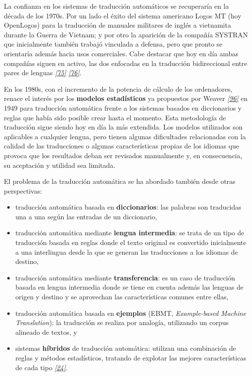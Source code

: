 \documentclass[a4paper,12pt,spanish]{book}
\begin{document}
La confianza en los sistemas de traducción automáticos se recuperaría en la década de
los 1970s. Por un lado el éxito del sistema americano Logos MT (hoy OpenLogos) para
la traducción de manuales militares de inglés a vietnamita durante la Guerra de
Vietnam; y por otro la aparición de la compañía SYSTRAN que inicialmente también
trabajó vinculada a defensa, pero que pronto se orientaría además hacia usos comerciales.
Cabe destacar que hoy en día ambas compañías siguen en activo, las dos enfocadas en la
traducción bidireccional entre pares de lenguas \label{0.intro:id19}{\hyperref[zreferences:scott2009]{\emph{{[}75{]}}}} \label{0.intro:id20}{\hyperref[zreferences:senellart2001]{\emph{{[}76{]}}}}.

En los 1980s, con el incremento de la potencia de cálculo de los ordenadores, renace
el interés por los \textbf{modelos estadísticos} ya propuestos por Weaver
\label{0.intro:id21}{\hyperref[zreferences:weaver1949]{\emph{{[}96{]}}}} en 1949 para traducción automática frente a los
sistemas basados en diccionarios y reglas que había sido posible crear hasta el
momento. Esta metodología de traducción sigue siendo hoy en día la más extendida.
Los modelos utilizados son aplicables a cualquier lengua, pero tienen algunas
dificultades relacionadas con la calidad de las traducciones o algunas
características propias de los idiomas que provoca que los resultados deban ser
revisados manualmente y, en consecuencia, su aceptación y utilidad sea limitada.

El problema de la traducción automática se ha abordado también desde otras perspectivas:
\begin{itemize}
\item {} 
traducción automática basada en \textbf{diccionarios}: las palabras son traducidas
una a una según las entradas de un diccionario,

\item {} 
traducción automática mediante \textbf{lengua intermedia}: se trata de un tipo de traducción
basada en reglas donde el texto original es convertido inicialmente a una
interlingua desde la que se generan las traducciones a los idiomas de destino,

\item {} 
traducción automática mediante \textbf{transferencia}: es un caso de traducción basada en
lengua intermedia donde se tiene en cuenta además las lenguas de origen y destino y se
aprovechan las características comunes entre ellas,

\item {} 
traducción automática basada en \textbf{ejemplos} (EBMT, \emph{Example-based Machine Translation}):
la traducción se realiza por analogía, utilizando un corpus alineado de textos, y

\item {} 
sistemas \textbf{híbridos} de traducción automática: utilizan una combinación de reglas y
métodos estadísticos, tratando de explotar las mejores características de cada
tipo \label{0.intro:id22}{\hyperref[zreferences:costa-jussa2014]{\emph{{[}24{]}}}}.

\end{itemize}
\end{document}
